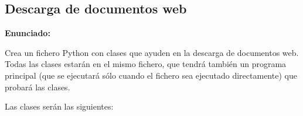 \subsection{Descarga de documentos web}
\label{subsec:eje-python-descarga-web}


\textbf{Enunciado:}

Crea un fichero Python con clases que ayuden en la descarga de documentos web. Todas las clases estarán en el mismo fichero, que tendrá también un programa principal (que se ejecutará sólo cuando el fichero sea ejecutado directamente) que probará las clases.

Las clases serán las siguientes:

